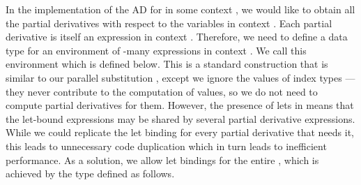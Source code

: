 In the implementation of the AD for  in some context , we would like to obtain
all the partial derivatives with respect to the variables in context .  Each partial
derivative is itself an expression  in context .  Therefore, we need to define
a data type for an environment of -many expressions in context .  We call this
environment  which is defined below.  This is a standard construction that is
similar to our parallel substitution , except we ignore the values of index
types --- they never contribute to the computation of values, so we do not need to
compute partial derivatives for them.  However, the presence of lets in 
means that the let-bound expressions may be shared by several partial derivative
expressions.  While we could replicate the let binding for every partial derivative
that needs it, this leads to unnecessary code duplication which in turn leads to
inefficient performance.  As a solution, we allow let bindings for the entire ,
which is achieved by the  type defined as follows.
